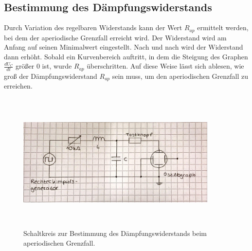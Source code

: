 \subsection{Bestimmung des Dämpfungswiderstands}
Durch Variation des regelbaren Widerstands kann der Wert $R_{ap}$ ermittelt werden, bei dem der aperiodische
Grenzfall erreicht wird.
Der Widerstand wird am Anfang auf seinen Minimalwert eingestellt. Nach und nach wird der Widerstand dann erhöht. 
Sobald ein Kurvenbereich auftritt, in dem die Steigung des Graphen $\frac{dU_{C}}{dt}$ größer 0 ist, wurde 
$R_{ap}$ überschritten. Auf diese Weise lässt sich ablesen, wie groß der Dämpfungswiderstand $R_{ap}$
sein muss, um den aperiodischen Grenzfall zu erreichen.
\begin{figure}
    \centering
    \includegraphics[width= 10cm, height= 7cm]{build/b.jpg}
    \caption{Schaltkreis zur Bestimmung des Dämpfungswiderstands beim aperiodischen Grenzfall.}
    \label{fig:b}
\end{figure}

